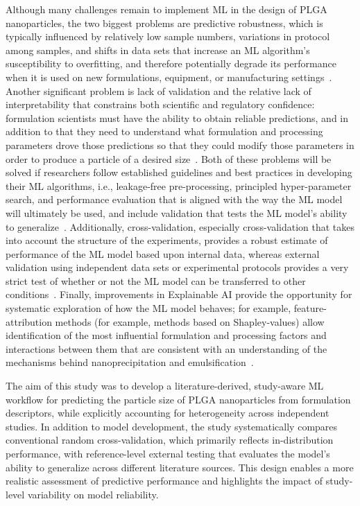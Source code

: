 \documentclass[10pt]{NSP1}
\begin{document}
Although many challenges remain to implement ML in the design of PLGA nanoparticles, the two
biggest problems are predictive robustness, which is typically influenced by relatively low sample
numbers, variations in protocol among samples, and shifts in data sets that increase an ML
algorithm's susceptibility to overfitting, and therefore potentially degrade its performance when
it is used on new formulations, equipment, or manufacturing settings~\cite{ref16,ref17}. Another
significant problem is lack of validation and the relative lack of interpretability that constrains
both scientific and regulatory confidence: formulation scientists must have the ability to obtain
reliable predictions, and in addition to that they need to understand what formulation and
processing parameters drove those predictions so that they could modify those parameters in order
to produce a particle of a desired size~\cite{ref21,ref22}. Both of these problems will be solved
if researchers follow established guidelines and best practices in developing their ML algorithms,
i.e., leakage-free pre-processing, principled hyper-parameter search, and performance evaluation
that is aligned with the way the ML model will ultimately be used, and include validation that
tests the ML model's ability to generalize~\cite{ref23}. Additionally, cross-validation, especially
cross-validation that takes into account the structure of the experiments, provides a robust
estimate of performance of the ML model based upon internal data, whereas external validation using
independent data sets or experimental protocols provides a very strict test of whether or not the
ML model can be transferred to other conditions~\cite{ref24,ref25,ref26}. Finally, improvements in
Explainable AI provide the opportunity for systematic exploration of how the ML model behaves; for
example, feature-attribution methods (for example, methods based on Shapley-values) allow
identification of the most influential formulation and processing factors and interactions between
them that are consistent with an understanding of the mechanisms behind nanoprecipitation and
emulsification~\cite{ref22,ref23}.

The aim of this study was to develop a literature-derived, study-aware ML workflow for predicting
the particle size of PLGA nanoparticles from formulation descriptors, while explicitly accounting
for heterogeneity across independent studies. In addition to model development, the study
systematically compares conventional random cross-validation, which primarily reflects
in-distribution performance, with reference-level external testing that evaluates the model's
ability to generalize across different literature sources. This design enables a more realistic
assessment of predictive performance and highlights the impact of study-level variability on model
reliability.
\end{document}
